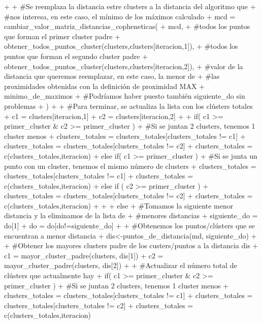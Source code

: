 \documentclass[parskip=full]{scrartcl}
\begin{document}
\begin{Schunk}
\begin{Sinput}
{{{+       
+       #Se reemplaza la distancia estre clusters a la distancia del algoritmo que
+       #nos interesa, en este caso, el mínimo de los máximos calculado
+       mcd = cambiar_valor_matriz_distancias_copheneticas(
+         mcd,
+         #todos los puntos que forman el primer cluster padre
+         obtener_todos_puntos_cluster(clusters,clusters[iteracion,1]), 
+         #todos los puntos que forman el segundo cluster padre
+         obtener_todos_puntos_cluster(clusters,clusters[iteracion,2]), 
+         #valor de la distancia que queremos reemplazar, en este caso, la menor de
+         #las proximidades obtenidas con la definición de proximidad MAX
+         minimo_de_maximos
+         #Podríamos haber puesto también siguiente_do sin problemas
+       )
+       
+       #Para terminar, se actualiza la lista con los clústers totales
+       c1 = clusters[iteracion,1]
+       c2 = clusters[iteracion,2]
+       
+       if( c1 >= primer_cluster & c2 >= primer_cluster ) {
+         #Si se juntan 2 clusters, tenemos 1 cluster menos
+         clusters_totales = clusters_totales[clusters_totales != c1]
+         clusters_totales = clusters_totales[clusters_totales != c2]
+         clusters_totales = c(clusters_totales,iteracion)
+       } else if( c1 >= primer_cluster ) {
+         #Si se junta un punto con un cluster, tenemos el mismo número de clusters
+         clusters_totales = clusters_totales[clusters_totales != c1]
+         clusters_totales = c(clusters_totales,iteracion)
+       } else if ( c2 >= primer_cluster ) {
+         clusters_totales = clusters_totales[clusters_totales != c2]
+         clusters_totales = c(clusters_totales,iteracion)
+       }
+       
+     } else {
+       #Tomamos la siguiente menor distancia y la eliminamos de la lista de 
+       #menores distancias
+       siguiente_do = do[1]
+       do = do[do!=siguiente_do]
+       
+       #Obtenemos los puntos/clústers que se encuentran a menor distancia
+       dis<-puntos_de_distancia(md, siguiente_do)
+       
+       #Obtener los mayores clusters padre de los custers/puntos a la distancia dis
+       c1 = mayor_cluster_padre(clusters, dis[1])
+       c2 = mayor_cluster_padre(clusters, dis[2])
+       
+       #Actualizar el número total de clústers que actualmente hay
+       if( c1 >= primer_cluster & c2 >= primer_cluster ) {
+         #Si se juntan 2 clusters, tenemos 1 cluster menos
+         clusters_totales = clusters_totales[clusters_totales != c1]
+         clusters_totales = clusters_totales[clusters_totales != c2]
+         clusters_totales = c(clusters_totales,iteracion)
}}}}
\end{Sinput}
\end{Schunk}
\end{document}
